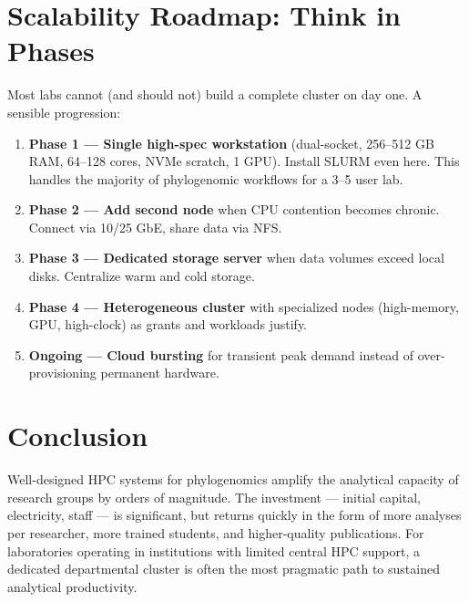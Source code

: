 \section{Scalability Roadmap: Think in Phases}

Most labs cannot (and should not) build a complete cluster on day one. A sensible progression:

\begin{enumerate}
\item \textbf{Phase 1 --- Single high-spec workstation} (dual-socket, 256--512 GB RAM, 64--128 cores, NVMe scratch, 1 GPU). Install SLURM even here. This handles the majority of phylogenomic workflows for a 3--5 user lab.

\item \textbf{Phase 2 --- Add second node} when CPU contention becomes chronic. Connect via 10/25 GbE, share data via NFS.

\item \textbf{Phase 3 --- Dedicated storage server} when data volumes exceed local disks. Centralize warm and cold storage.

\item \textbf{Phase 4 --- Heterogeneous cluster} with specialized nodes (high-memory, GPU, high-clock) as grants and workloads justify.

\item \textbf{Ongoing --- Cloud bursting} for transient peak demand instead of over-provisioning permanent hardware.
\end{enumerate}

\section{Conclusion}

Well-designed HPC systems for phylogenomics amplify the analytical capacity of research groups by orders of magnitude. The investment --- initial capital, electricity, staff --- is significant, but returns quickly in the form of more analyses per researcher, more trained students, and higher-quality publications. For laboratories operating in institutions with limited central HPC support, a dedicated departmental cluster is often the most pragmatic path to sustained analytical productivity.

